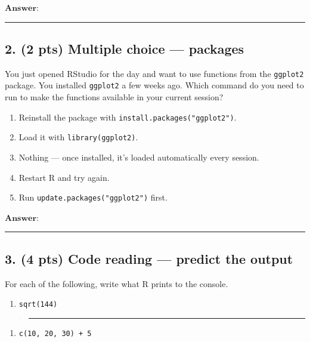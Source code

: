 \documentclass[
  11pt,
  letterpaper,
  DIV=11,
  numbers=noendperiod]{scrartcl}
\providecommand{\tightlist}{%
  \setlength{\itemsep}{0pt}\setlength{\parskip}{0pt}}
\begin{document}
\vspace{0.25em}

$\textbf{Answer:}$ \rule{1in}{0.4pt}

\newpage

\subsection{2. (2 pts) Multiple choice --- packages}

You just opened RStudio for the day and want to use functions from the \texttt{ggplot2} package. You installed \texttt{ggplot2} a few weeks ago. Which command do you need to run to make the functions available in your current session?

\vspace{0.25em}

\begin{enumerate}
\def\labelenumi{(\Alph{enumi})}
\tightlist
\item Reinstall the package with \texttt{install.packages("ggplot2")}.
\item Load it with \texttt{library(ggplot2)}.
\item Nothing --- once installed, it's loaded automatically every session.
\item Restart R and try again.
\item Run \texttt{update.packages("ggplot2")} first.
\end{enumerate}

$\textbf{Answer:}$ \rule{1in}{0.4pt}

\subsection{3. (4 pts) Code reading --- predict the output}

For each of the following, write what R prints to the console.

\vspace{0.25em}

\begin{enumerate}
\def\labelenumi{(\alph{enumi})}
\tightlist
\item \texttt{sqrt(144)}
\end{enumerate}

\begin{quote}
\rule{4in}{0.4pt}
\end{quote}

\vspace{0.5em}

\begin{enumerate}
\def\labelenumi{(\alph{enumi})}
\setcounter{enumi}{1}
\tightlist
\item \texttt{c(10,\ 20,\ 30)\ +\ 5}
\end{enumerate}
\end{document}
